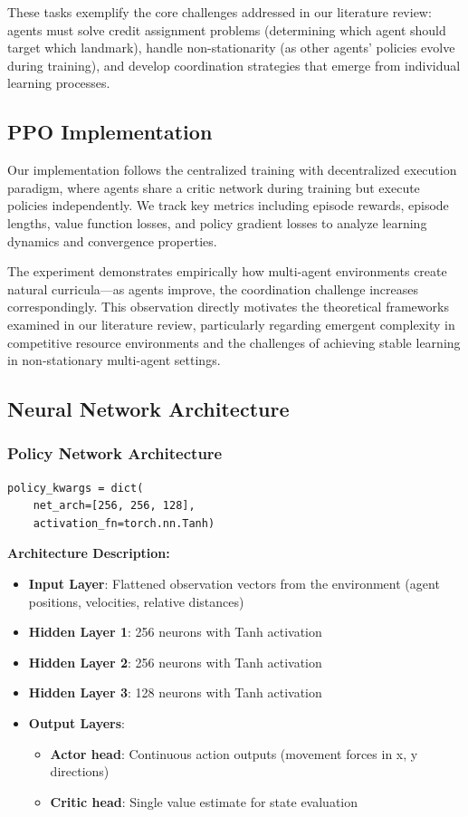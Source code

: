 These tasks exemplify the core challenges addressed in our literature review: agents must solve credit assignment problems (determining which agent should target which landmark), handle non-stationarity (as other agents' policies evolve during training), and develop coordination strategies that emerge from individual learning processes.


\subsection{PPO Implementation}

Our implementation follows the centralized training with decentralized execution paradigm, where agents share a critic network during training but execute policies independently. We track key metrics including episode rewards, episode lengths, value function losses, and policy gradient losses to analyze learning dynamics and convergence properties.

The experiment demonstrates empirically how multi-agent environments create natural curricula—as agents improve, the coordination challenge increases correspondingly. This observation directly motivates the theoretical frameworks examined in our literature review, particularly regarding emergent complexity in competitive resource environments and the challenges of achieving stable learning in non-stationary multi-agent settings.

\subsection{Neural Network Architecture}

\subsubsection{Policy Network Architecture}

\begin{verbatim}
policy_kwargs = dict(
    net_arch=[256, 256, 128],
    activation_fn=torch.nn.Tanh)
\end{verbatim}

\textbf{Architecture Description:}
\begin{itemize}
    \item \textbf{Input Layer}: Flattened observation vectors from the environment (agent positions, velocities, relative distances)
    \item \textbf{Hidden Layer 1}: 256 neurons with Tanh activation
    \item \textbf{Hidden Layer 2}: 256 neurons with Tanh activation
    \item \textbf{Hidden Layer 3}: 128 neurons with Tanh activation
    \item \textbf{Output Layers}:
    \begin{itemize}
        \item \textbf{Actor head}: Continuous action outputs (movement forces in x, y directions)
        \item \textbf{Critic head}: Single value estimate for state evaluation
    \end{itemize}
\end{itemize}

